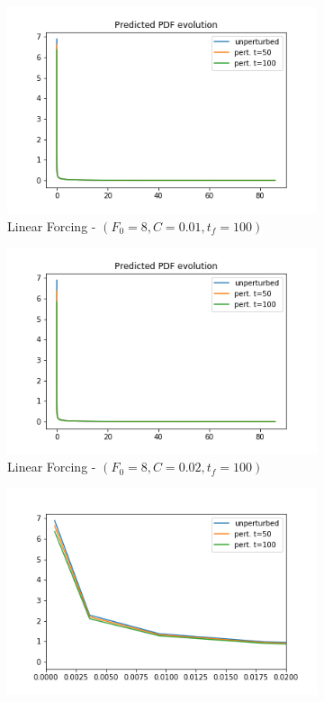 \documentclass{article}
\begin{document}
\begin{figure}[!ht]
\begin{subfigure}[b]{0.48\textwidth}
		\includegraphics[width=1\linewidth]{fig/pred_pdf_energy_below_L_001_100.png}
		\caption{Linear Forcing - $(F_0=8, C=0.01, t_f=100)$}
		\label{fig:pred_pdf_energy_bin_00q_10q_LF_8_001_0_100}
	\end{subfigure}%
	\begin{subfigure}[b]{0.48\textwidth}
		\includegraphics[width=1\linewidth]{fig/pred_pdf_energy_below_L_002_100.png}
		\caption{Linear Forcing - $(F_0=8, C=0.02, t_f=100)$}
		\label{fig:pred_pdf_energy_bin_00q_10q_LF_8_002_0_100}
	\end{subfigure}
	\begin{subfigure}[b]{0.48\textwidth}
		\includegraphics[width=1\linewidth]{fig/pred_pdf_zoom_energy_below_L_001_100.png}

\end{subfigure}
\end{figure}
\end{document}
